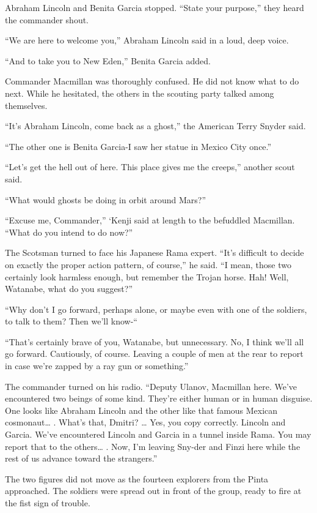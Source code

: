 \documentclass[]{article}
\begin{document}
{Abraham Lincoln and Benita Garcia stopped. “State your purpose,” they heard the commander shout.

“We are here to welcome you,” Abraham Lincoln said in a loud, deep voice.

“And to take you to New Eden,” Benita Garcia added.

Commander Macmillan was thoroughly confused. He did not know what to do next. While he hesitated, the others in the scouting party talked among themselves.

“It’s Abraham Lincoln, come back as a ghost,” the American Terry Snyder said.

“The other one is Benita Garcia-I saw her statue in Mexico City once.”

“Let’s get the hell out of here. This place gives me the creeps,” another scout said.

“What would ghosts be doing in orbit around Mars?”

“Excuse me, Commander,” ‘Kenji said at length to the befuddled Macmillan. “What do you intend to do now?”

The Scotsman turned to face his Japanese Rama expert. “It’s difficult to decide on exactly the proper action pattern, of course,” he said. “I mean, those two certainly look harmless enough, but remember the Trojan horse. Hah! Well, Watanabe, what do you suggest?”

“Why don’t I go forward, perhaps alone, or maybe even with one of the soldiers, to talk to them? Then we’ll know-“

“That’s certainly brave of you, Watanabe, but unnecessary. No, I think we’ll all go forward. Cautiously, of course. Leaving a couple of men at the rear to report in case we’re zapped by a ray gun or something.”

The commander turned on his radio. “Deputy Ulanov, Macmillan here. We’ve encountered two beings of some kind. They’re either human or in human disguise. One looks like Abraham Lincoln and the other like that famous Mexican cosmonaut… . What’s that, Dmitri? … Yes, you copy correctly. Lincoln and Garcia. We’ve encountered Lincoln and Garcia in a tunnel inside Rama. You may report that to the others… . Now, I’m leaving Sny-der and Finzi here while the rest of us advance toward the strangers.”

The two figures did not move as the fourteen explorers from the Pinta approached. The soldiers were spread out in front of the group, ready to fire at the fist sign of trouble.

}
\end{document}
